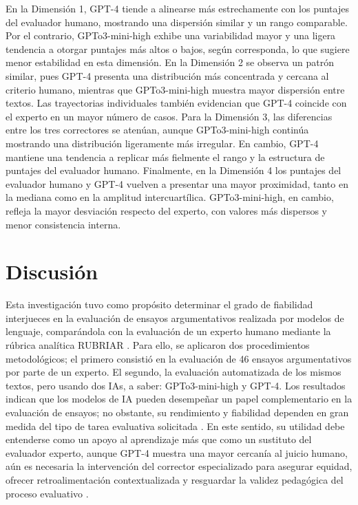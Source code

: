 \documentclass[spanish]{textolivre}
\begin{document}
En la Dimensión 1, GPT-4 tiende a alinearse más estrechamente con los puntajes del evaluador humano, mostrando una dispersión similar y un rango comparable. Por el contrario, GPTo3-mini-high exhibe una variabilidad mayor y una ligera tendencia a otorgar puntajes más altos o bajos, según corresponda, lo que sugiere menor estabilidad en esta dimensión. En la Dimensión 2 se observa un patrón similar, pues GPT-4 presenta una distribución más concentrada y cercana al criterio humano, mientras que GPTo3-mini-high muestra mayor dispersión entre textos. Las trayectorias individuales también evidencian que GPT-4 coincide con el experto en un mayor número de casos. Para la Dimensión 3, las diferencias entre los tres correctores se atenúan, aunque GPTo3-mini-high continúa mostrando una distribución ligeramente más irregular. En cambio, GPT-4 mantiene una tendencia a replicar más fielmente el rango y la estructura de puntajes del evaluador humano. Finalmente, en la Dimensión 4 los puntajes del evaluador humano y GPT-4 vuelven a presentar una mayor proximidad, tanto en la mediana como en la amplitud intercuartílica. GPTo3-mini-high, en cambio, refleja la mayor desviación respecto del experto, con valores más dispersos y menor consistencia interna.

\section{Discusión}
Esta investigación tuvo como propósito determinar el grado de fiabilidad interjueces en la evaluación de ensayos argumentativos realizada por modelos de lenguaje, comparándola con la evaluación de un experto humano mediante la rúbrica analítica RUBRIAR \cite{kloss2024}. Para ello, se aplicaron dos procedimientos metodológicos; el primero consistió en la evaluación de 46 ensayos argumentativos por parte de un experto. El segundo, la evaluación automatizada de los mismos textos, pero usando dos IAs, a saber: GPTo3-mini-high y GPT-4. Los resultados indican que los modelos de IA pueden desempeñar un papel complementario en la evaluación de ensayos; no obstante, su rendimiento y fiabilidad dependen en gran medida del tipo de tarea evaluativa solicitada \cite{teng2024, teng2025}. En este sentido, su utilidad debe entenderse como un apoyo al aprendizaje más que como un sustituto del evaluador experto, aunque GPT-4 muestra una mayor cercanía al juicio humano, aún es necesaria la intervención del corrector especializado para asegurar equidad, ofrecer retroalimentación contextualizada y resguardar la validez pedagógica del proceso evaluativo \cite{mateogirona2025}.
\end{document}
